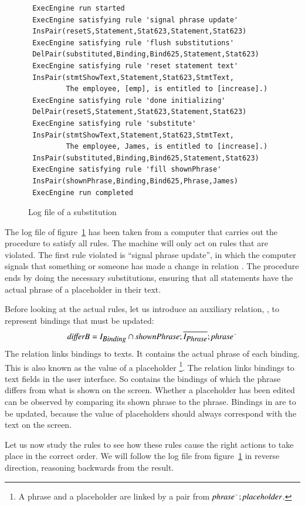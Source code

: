 \documentclass{elsarticle}
\begin{document}
\begin{figure}[htb]
\begin{verbatim}
 ExecEngine run started
 ExecEngine satisfying rule 'signal phrase update'
 InsPair(resetS,Statement,Stat623,Statement,Stat623)
 ExecEngine satisfying rule 'flush substitutions'
 DelPair(substituted,Binding,Bind625,Statement,Stat623)
 ExecEngine satisfying rule 'reset statement text'
 InsPair(stmtShowText,Statement,Stat623,StmtText,
         The employee, [emp], is entitled to [increase].)
 ExecEngine satisfying rule 'done initializing'
 DelPair(resetS,Statement,Stat623,Statement,Stat623)
 ExecEngine satisfying rule 'substitute'
 InsPair(stmtShowText,Statement,Stat623,StmtText,
         The employee, James, is entitled to [increase].)
 InsPair(substituted,Binding,Bind625,Statement,Stat623)
 ExecEngine satisfying rule 'fill shownPhrase'
 InsPair(shownPhrase,Binding,Bind625,Phrase,James)
 ExecEngine run completed
\end{verbatim}
\caption{Log file of a substitution}
\label{fig:log file}
\end{figure}
	The log file of figure~\ref{fig:log file} has been taken from a computer that carries out the procedure to satisfy all rules.
	The machine will only act on rules that are violated.
	The first rule violated is ``signal phrase update'', in which the computer signals that something or someone has made a change
	in relation .
	The procedure ends by doing the necessary substitutions,
	ensuring that all statements have the actual phrase of a placeholder in their text.

	Before looking at the actual rules,
	let us introduce an auxiliary relation, , to represent bindings that must be updated:
\[\text{\em differB\/} = I_{\text{\em \small Binding\/}}\cap\text{\em shownPhrase\/};\overline{I_{\text{\em \small Phrase\/}}};{\text{\em phrase\/}}^\smallsmile\]
	The relation  links bindings to texts.
	It contains the actual phrase of each binding.
	This is also known as the value of a placeholder%
\footnote{A phrase and a placeholder are linked by a pair from ${\text{\em phrase\/}}^\smallsmile;\text{\em placeholder\/}$.}.
	The relation  links bindings to text fields in the user interface.
	So  contains the bindings of which the phrase differs from what is shown on the screen.
	Whether a placeholder has been edited can be observed by comparing its shown phrase to the phrase.
	Bindings in  are to be updated,
	because the value of placeholders should always correspond with the text on the screen.

	Let us now study the rules to see how these rules cause the right actions to take place in the correct order.
	We will follow the log file from figure~\ref{fig:log file} in reverse direction,
	reasoning backwards from the result.
\end{document}
